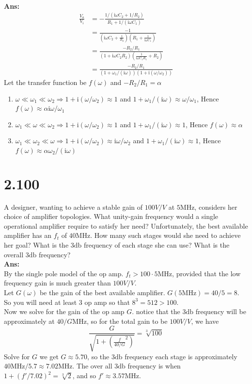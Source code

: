 \documentclass[12pt, a4paper]{article}
\newcommand{\sdb}{\si{\decibel}}
\newcommand{\img}{\mathrm{i}}
\newcommand{\Ans}{{\\ \bf Ans:} \\}
\begin{document}
\Ans
\begin{align*}
  \frac{V_o}{V_i} &= -\frac{1 / (\img \omega C_2 + 1 / R_2)}{R_1 + 1 / (\img \omega C_1)}\\
  &= \frac{-1}{\left( \img \omega C_2 + \frac{1}{R_2} \right) \left( R_1 + \frac{1}{\img \omega C_1} \right)}\\
  &= \frac{-R_2/R_1}{(1 + \img \omega C_2 R_2) \left( \frac{1}{\img \omega C_1 R_1} + R_2 \right)}\\
  &= \frac{-R_2/R_1}{(1+\omega_1/(\img \omega))(1+\img(\omega/\omega_2))}
\end{align*}
Let the transfer function be $f(\omega)$ and $- R_2 / R_1 = \alpha$
\begin{enumerate}[label=(\alph*)]
  \item $\omega \ll \omega_1 \ll \omega_2 \Rightarrow 1 + \img(\omega / \omega_2) \approx 1$ and $1 + \omega_1/(\img \omega) \approx \omega / \omega_1$, Hence $f(\omega) \approx \alpha \img \omega / \omega_1$
  \item $\omega_1 \ll \omega \ll \omega_2 \Rightarrow 1 + \img(\omega / \omega_2) \approx 1$ and $1 + \omega_1/(\img \omega) \approx 1$, Hence $f(\omega) \approx \alpha$
  \item $\omega_1 \ll \omega_2 \ll \omega \Rightarrow 1 + \img(\omega / \omega_2) \approx \img \omega / \omega_2$ and $1 + \omega_1/(\img \omega) \approx 1$, Hence $f(\omega) \approx \alpha \omega_2 / (\img \omega)$
\end{enumerate}

\section{2.100}
A designer, wanting to achieve a stable gain of $100 \si{V/V}$ at $5 \si{\mega\hertz}$, considers her choice of amplifier topologies. What unity-gain frequency would a single operational amplifier require to satisfy her need? Unfortunately, the best available amplifier has an $f_t$ of $40 \si{\mega\hertz}$. How many such stages would she need to achieve her goal? What is the $3\sdb$ frequency of each stage she can use? What is the overall $3\sdb$ frequency?
\Ans
By the single pole model of the op amp. $f_t > 100 \cdot 5 \si{\mega\hertz}$, provided that the low frequency gain is much greater than $100 \si{V/V}$.\\ 
Let $G(\omega)$ be the gain of the best available amplifier. $G(5\si{\mega\hertz}) = 40 / 5 = 8$. So you will need at least $3$ op amp so that $8^3 = 512 > 100$.\\
Now we solve for the gain of the op amp $G$. notice that the $3\sdb$ frequency will be approximately at $40/G \si{\mega\hertz}$, so for the total gain to be $100 \si{V/V}$, we have
\[
  \frac{G}{\displaystyle \sqrt{1 + \left(\frac{f}{40 / G}^2\right)}} = \sqrt[3]{100}
\]
Solve for $G$ we get $G \approx 5.70$, so the $3 \sdb$ frequency each stage is approximately $40\si{\mega\hertz} / 5.7 \approx 7.02\si{\mega\hertz}$. The over all $3 \sdb$ frequency is when $1 + (f'/7.02)^2 = \sqrt[3]{2}$, and so $f' \approx 3.57 \si{\mega\hertz}$.
\end{document}
